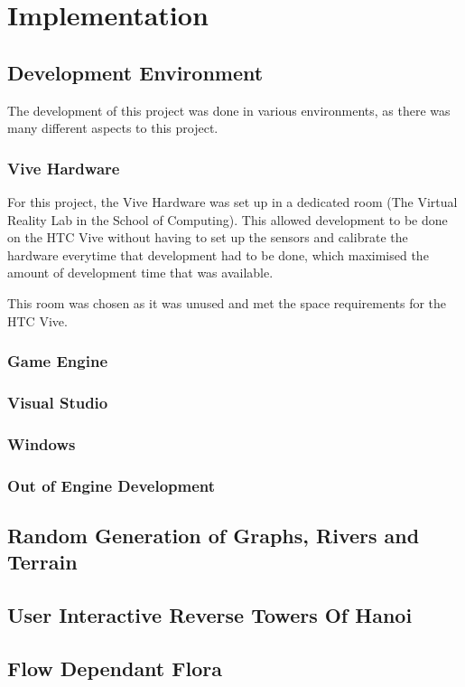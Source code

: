 \chapter{Implementation}
\label{chapter6}

\section{Development Environment}
The development of this project was done in various environments, as there was many different aspects to this project.

\subsection{Vive Hardware}
	For this project, the Vive Hardware was set up in a dedicated room (The Virtual Reality Lab in the School of Computing). This allowed development to be done on the HTC Vive without having to set up the sensors and calibrate the hardware everytime that development had to be done, which maximised the amount of development time that was available.


	This room was chosen as it was unused and met the space requirements for the HTC Vive.

\subsection{Game Engine}
\lipsum[1-1] \cite{parikh1980adaptive}

\subsection{Visual Studio}

\subsection{Windows}

\subsection{Out of Engine Development}
\lipsum[1-1] \cite{parikh1980adaptive}

\section{Random Generation of Graphs, Rivers and Terrain}
\lipsum[1-1] \cite{parikh1980adaptive}

\subsection{}

\section{User Interactive Reverse Towers Of Hanoi}
\lipsum[1-1] \cite{parikh1980adaptive}


\section{Flow Dependant Flora}
\lipsum[1-1] \cite{parikh1980adaptive}